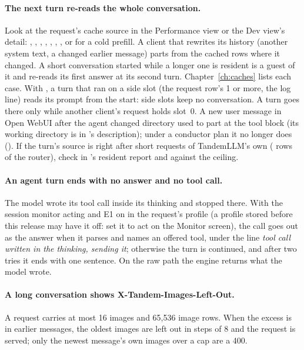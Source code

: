 \paragraph{The next turn re-reads the whole conversation.} Look at the request's cache source in the Performance view or the Dev view's detail: , , , , , , , or  for a cold prefill. A client that rewrites its history (another system text, a changed earlier message) parts from the cached rows where it changed. A short conversation started while a longer one is resident is a guest of it and re-reads its first answer at its second turn. Chapter~\ref{ch:caches} lists each case. With , a turn that ran on a side slot (the request row's  1 or more, the \code{[parallel]} log line) reads its prompt from the start: side slots keep no conversation. A turn goes there only while another client's request holds slot~0. A new user message in Open WebUI after the agent changed directory used to part at the tool block (its working directory is in 's description); under a conductor plan it no longer does (). If the turn's source is  right after short requests of TandemLLM's own ( rows of the router), check  in 's resident report and  against the ceiling.

\paragraph{An agent turn ends with no answer and no tool call.} The model wrote its tool call inside its thinking and stopped there. With the session monitor acting and E1 on in the request's profile (a profile stored before this release may have it off: set it to act on the Monitor screen), the call goes out as the answer when it parses and names an offered tool, under the line \emph{tool call written in the thinking, sending it}; otherwise the turn is continued, and after two tries it ends with one sentence. On the raw path the engine returns what the model wrote.

\paragraph{A long conversation shows X-Tandem-Images-Left-Out.} A request carries at most 16 images and 65,536 image rows. When the excess is in earlier messages, the oldest images are left out in steps of 8 and the request is served; only the newest message's own images over a cap are a 400.

